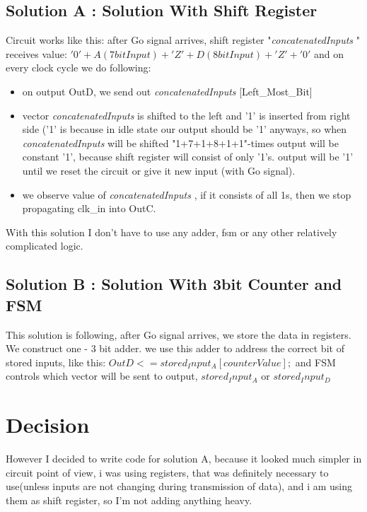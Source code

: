 \documentclass{article}
\newcommand{\concatenatedInputs}{\textit{concatenatedInputs }}
\begin{document}
\subsection{Solution A : Solution With Shift Register}
Circuit works like this: after Go signal arrives, shift register "\concatenatedInputs" receives value: 
\newline $ '0' + A(7bitInput) + 'Z' + D(8bitInput) + 'Z' + '0' $ \newline
and on every clock cycle we do following: \newline
\begin{itemize}
\item on output OutD, we send out \concatenatedInputs[Left\_Most\_Bit]
\item vector \concatenatedInputs is shifted to the left and '1' is inserted from right side ('1' is because in idle state our output should be '1' anyways, so when \concatenatedInputs will be shifted "1+7+1+8+1+1"-times output will be constant '1', because shift register will consist of only '1's. output will be '1' until we reset the circuit or give it new input (with Go signal).
\item we observe value of \concatenatedInputs, if it consists of all 1s, then we stop propagating clk\_in into OutC.
\end{itemize}
With this solution I don't have to use any adder, fsm or any other relatively complicated logic. 


\subsection{Solution B : Solution With 3bit Counter and FSM}
This solution is following, after Go signal arrives, we store the data in registers. We construct one - 3 bit adder. we use this adder to address the correct bit of stored inputs, like this: \newline
$ OutD <= stored_Input_A [counterValue]; $
and FSM controls which vector will be sent to output, $stored_Input_A$ or $stored_Input_D$


\section{Decision}
However I decided to write code for solution A, because it looked much simpler in circuit point of view, i was using registers, that was definitely necessary to use(unless inputs are not changing during transmission of data), and i am using them as shift register, so I'm not adding anything heavy.
\end{document}
